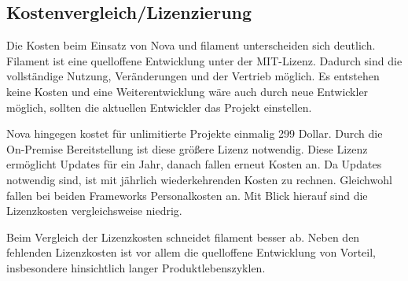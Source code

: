 \subsection{Kostenvergleich/Lizenzierung}
Die Kosten beim Einsatz von Nova und filament unterscheiden sich deutlich.
Filament ist eine quelloffene Entwicklung unter der MIT-Lizenz.
Dadurch sind die vollständige Nutzung, Veränderungen und der Vertrieb möglich.
Es entstehen keine Kosten und eine Weiterentwicklung wäre auch durch neue Entwickler möglich, sollten die aktuellen Entwickler das Projekt einstellen.

Nova hingegen kostet für unlimitierte Projekte einmalig 299 Dollar.
Durch die On-Premise Bereitstellung ist diese größere Lizenz notwendig.
Diese Lizenz ermöglicht Updates für ein Jahr, danach fallen erneut Kosten an.
Da Updates notwendig sind, ist mit jährlich wiederkehrenden Kosten zu rechnen.
Gleichwohl fallen bei beiden Frameworks Personalkosten an.
Mit Blick hierauf sind die Lizenzkosten vergleichsweise niedrig.

Beim Vergleich der Lizenzkosten schneidet filament besser ab.
Neben den fehlenden Lizenzkosten ist vor allem die quelloffene Entwicklung von Vorteil, insbesondere hinsichtlich langer Produktlebenszyklen.

